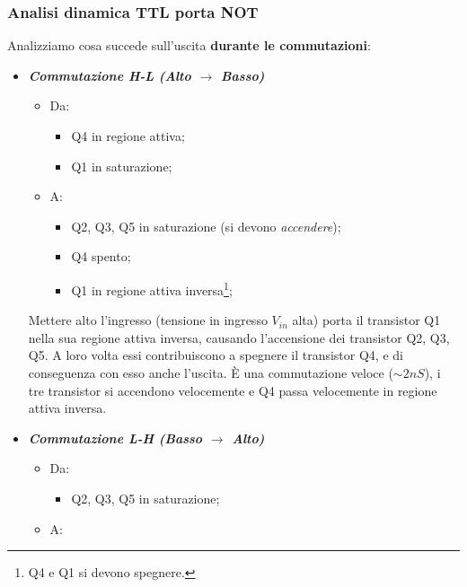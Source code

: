 \documentclass[
]{book}
\providecommand{\tightlist}{%
  \setlength{\itemsep}{0pt}\setlength{\parskip}{0pt}}
\begin{document}
\subsubsection{Analisi dinamica TTL porta
NOT}\label{analisi-dinamica-ttl-porta-not}

Analizziamo cosa succede sull'uscita \textbf{durante le commutazioni}:

\begin{itemize}
\item
  \textbf{\emph{Commutazione H-L (Alto \(\to\) Basso)}}

  \begin{itemize}
  \tightlist
  \item
    Da:

    \begin{itemize}
    \tightlist
    \item
      Q4 in regione attiva;
    \item
      Q1 in saturazione;
    \end{itemize}
  \item
    A:

    \begin{itemize}
    \tightlist
    \item
      Q2, Q3, Q5 in saturazione (si devono \emph{accendere});
    \item
      Q4 spento;
    \item
      Q1 in regione attiva inversa\footnote{Q4 e Q1 si devono spegnere.};
    \end{itemize}
  \end{itemize}

  Mettere alto l'ingresso (tensione in ingresso \(V_{in}\) alta) porta
  il transistor Q1 nella sua regione attiva inversa, causando
  l'accensione dei transistor Q2, Q3, Q5. A loro volta essi
  contribuiscono a spegnere il transistor Q4, e di conseguenza con esso
  anche l'uscita. È una commutazione veloce (\(\sim 2nS\)), i tre
  transistor si accendono velocemente e Q4 passa velocemente in regione
  attiva inversa.
\item
  \textbf{\emph{Commutazione L-H (Basso \(\to\) Alto)}}

  \begin{itemize}
  \tightlist
  \item
    Da:

    \begin{itemize}
    \tightlist
    \item
      Q2, Q3, Q5 in saturazione;
    \end{itemize}
  \item
    A:


\end{itemize}
\end{itemize}
\end{document}
